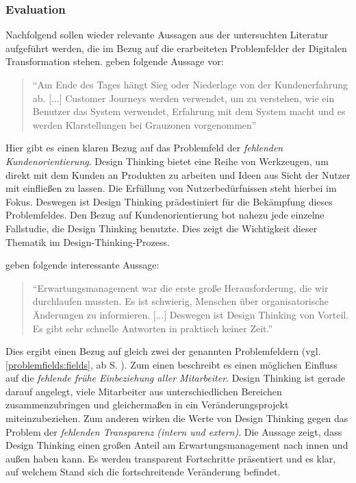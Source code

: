 \subsubsection{Evaluation}

Nachfolgend sollen wieder relevante Aussagen aus der untersuchten Literatur aufgeführt werden, die im Bezug auf die erarbeiteten Problemfelder der Digitalen Transformation stehen.  geben folgende Aussage vor: 

\begin{quote}
	``Am Ende des Tages hängt Sieg oder Niederlage von der Kundenerfahrung ab. [...] Customer Journeys werden verwendet, um zu verstehen, wie ein Benutzer das System verwendet, Erfahrung mit dem System macht und es werden Klarstellungen bei Grauzonen vorgenommen'' \cite[S. 3]{prasad_adopting_2018}
\end{quote}

Hier gibt es einen klaren Bezug auf das Problemfeld der \textit{fehlenden Kundenorientierung}. Design Thinking bietet eine Reihe von Werkzeugen, um direkt mit dem Kunden an Produkten zu arbeiten und Ideen aus Sicht der Nutzer mit einfließen zu lassen. Die Erfüllung von Nutzerbedürfnissen steht hierbei im Fokus. Deswegen ist Design Thinking prädestiniert für die Bekämpfung dieses Problemfeldes. Den Bezug auf Kundenorientierung bot nahezu jede einzelne Fallstudie, die Design Thinking benutzte. Dies zeigt die Wichtigkeit dieser Thematik im Design-Thinking-Prozess.

 geben folgende interessante Aussage:

\begin{quote}
	``Erwartungsmanagement war die erste große Herausforderung, die wir durchlaufen mussten. Es ist schwierig, Menschen über organisatorische Änderungen zu informieren. [...] Deswegen ist Design Thinking von Vorteil. Es gibt sehr schnelle Antworten in praktisch keiner Zeit.'' \cite{mihelic_embracing_nodate}
\end{quote}

Dies ergibt einen Bezug auf gleich zwei der genannten Problemfeldern  (vgl. \ref{problemfields:fields}, ab S. \pageref{problemfields:fields}). Zum einen beschreibt es einen möglichen Einfluss auf die \textit{fehlende frühe Einbeziehung aller Mitarbeiter}. Design Thinking ist gerade darauf angelegt, viele Mitarbeiter aus unterschiedlichen Bereichen zusammenzubringen und gleichermaßen in ein Veränderungsprojekt miteinzubeziehen. Zum anderen wirken die Werte von Design Thinking gegen das Problem der \textit{fehlenden Transparenz (intern und extern)}. Die Aussage zeigt, dass Design Thinking einen großen Anteil am Erwartungsmanagement nach innen und außen haben kann. Es werden transparent Fortschritte präsentiert und es klar, auf welchem Stand sich die fortschreitende Veränderung befindet.

